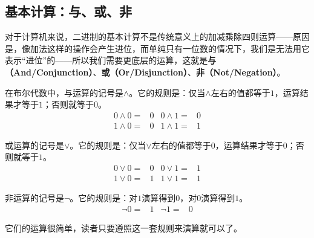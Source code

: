 \subsection*{基本计算：与、或、非}
对于计算机来说，二进制的基本计算不是传统意义上的加减乘除四则运算——原因是，像加法这样的操作会产生进位，而单纯只有一位数的情况下，我们是无法用它表示``进位''的——所以我们需要更底层的运算，这就是\textbf{与（And/Conjunction）}、\textbf{或（Or/Disjunction）}、\textbf{非（Not/Negation）}。\par
在布尔代数中，与运算的记号是$\land$。它的规则是：仅当$\land$左右的值都等于$1$，运算结果才等于$1$；否则就等于$0$。
\begin{align*}
0\land0={}&0{}&0\land1={}&0\\
1\land0={}&0{}&1\land1={}&1
\end{align*}\par
或运算的记号是$\lor$。它的规则是：仅当$\lor$左右的值都等于$0$，运算结果才等于$0$；否则就等于$1$。
\begin{align*}
0\lor0={}&0{}&0\lor1={}&1\\
1\lor0={}&1{}&1\lor1={}&1
\end{align*}\par
非运算的记号是$\lnot$。它的规则是：对$1$演算得到$0$，对$0$演算得到$1$。
\begin{align*}
\lnot0={}&1{}&\lnot1={}&0
\end{align*}\par
它们的运算很简单，读者只要遵照这一套规则来演算就可以了。\par
